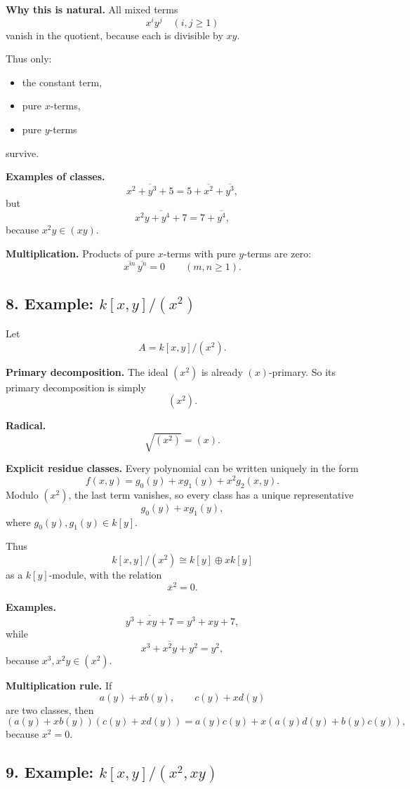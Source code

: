 \documentclass[12pt,a4paper]{article}
\theoremstyle{notespace}
\begin{document}
\textbf{Why this is natural.}
All mixed terms
\[
x^iy^j \quad (i,j\ge 1)
\]
vanish in the quotient, because each is divisible by \(xy\).

Thus only:
\begin{itemize}
	\item the constant term,
	\item pure \(x\)-terms,
	\item pure \(y\)-terms
\end{itemize}
survive.

\textbf{Examples of classes.}
\[
\overline{x^2+y^3+5} = 5+\overline{x^2}+\overline{y^3},
\]
but
\[
\overline{x^2y+y^4+7} = 7+\overline{y^4},
\]
because \(x^2y\in (xy)\).

\textbf{Multiplication.}
Products of pure \(x\)-terms with pure \(y\)-terms are zero:
\[
\overline{x^m}\,\overline{y^n}=0 \qquad (m,n\ge 1).
\]

\subsection*{8. Example: \(k[x,y]/(x^2)\)}

Let
\[
A=k[x,y]/(x^2).
\]

\textbf{Primary decomposition.}
The ideal \((x^2)\) is already \((x)\)-primary.
So its primary decomposition is simply
\[
(x^2).
\]

\textbf{Radical.}
\[
\sqrt{(x^2)}=(x).
\]

\textbf{Explicit residue classes.}
Every polynomial can be written uniquely in the form
\[
f(x,y)=g_0(y)+xg_1(y)+x^2g_2(x,y).
\]
Modulo \((x^2)\), the last term vanishes, so every class has a unique representative
\[
g_0(y)+xg_1(y),
\]
where \(g_0(y),g_1(y)\in k[y]\).

Thus
\[
k[x,y]/(x^2)\cong k[y]\oplus xk[y]
\]
as a \(k[y]\)-module, with the relation
\[
\overline x^2=0.
\]

\textbf{Examples.}
\[
\overline{y^3+xy+7}=y^3+x y+7,
\]
while
\[
\overline{x^3+x^2y+y^2}=y^2,
\]
because \(x^3,x^2y\in (x^2)\).

\textbf{Multiplication rule.}
If
\[
a(y)+x b(y),\qquad c(y)+x d(y)
\]
are two classes, then
\[
(a(y)+x b(y))(c(y)+x d(y))
=
a(y)c(y)+x(a(y)d(y)+b(y)c(y)),
\]
because \(x^2=0\).

\subsection*{9. Example: \(k[x,y]/(x^2,xy)\)}
\end{document}
